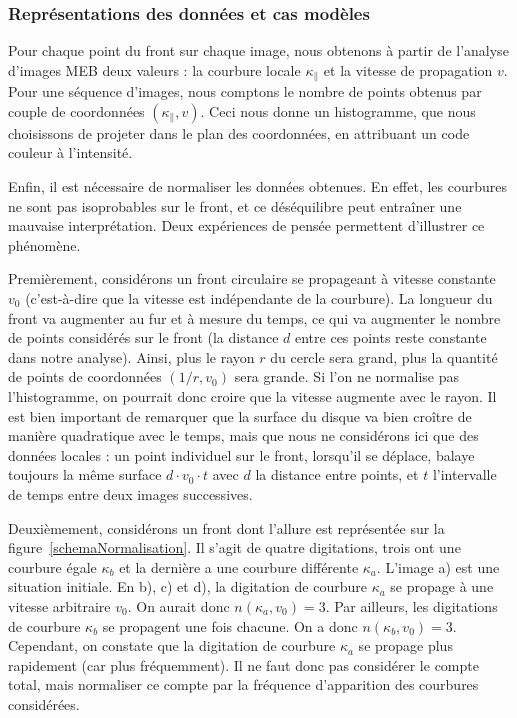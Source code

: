 {{			\subsubsection{Représentations des données et cas modèles}
Pour chaque point du front sur chaque image, nous obtenons à partir de l'analyse d'images MEB deux valeurs : la courbure locale $\kappa_\parallel$ et la vitesse de propagation $v$. Pour une séquence d’images, nous comptons le nombre de points obtenus par couple de coordonnées $(\kappa_\parallel,v)$. Ceci nous donne un histogramme, que nous choisissons de projeter dans le plan des coordonnées, en attribuant un code couleur à l’intensité.\par 
Enfin, il est nécessaire de normaliser les données obtenues. En effet, les courbures ne sont pas isoprobables sur le front, et ce déséquilibre peut entraîner une mauvaise interprétation. Deux expériences de pensée permettent d’illustrer ce phénomène.\par 
Premièrement, considérons un front circulaire se propageant à vitesse constante $v_0$ (c’est-à-dire que la vitesse est indépendante de la courbure). La longueur du front va augmenter au fur et à mesure du temps, ce qui va augmenter le nombre de points considérés sur le front (la distance $d$ entre ces points reste constante dans notre analyse). Ainsi, plus le rayon $r$ du cercle sera grand, plus la quantité de points de coordonnées $(1/r,v_0)$ sera grande. Si l’on ne normalise pas l’histogramme, on pourrait donc croire que la vitesse augmente avec le rayon. Il est bien important de remarquer que la surface du disque va bien croître de manière quadratique avec le temps, mais que nous ne considérons ici que des données locales : un point individuel sur le front, lorsqu’il se déplace, balaye toujours la même surface $d \cdot v_0 \cdot t$ avec $d$ la distance entre points, et $t$ l’intervalle de temps entre deux images successives.\par
Deuxièmement, considérons un front dont l’allure est représentée sur la figure~\ref{schemaNormalisation}. Il s'agit de quatre digitations, trois ont une courbure égale $\kappa_b$ et la dernière a une courbure différente $\kappa_a$. L'image a) est une situation initiale. En b), c) et d), la digitation de courbure $\kappa_a$ se propage à une vitesse arbitraire $v_0$. On aurait donc $n(\kappa_a,v_0)=3$. Par ailleurs, les digitations de courbure $\kappa_b$ se propagent une fois chacune. On a donc $n(\kappa_b,v_0)=3$. Cependant, on constate que la digitation de courbure $\kappa_a$ se propage plus rapidement (car plus fréquemment). Il ne faut donc pas considérer le compte total, mais normaliser ce compte par la fréquence d'apparition des courbures considérées.\par 
}}
